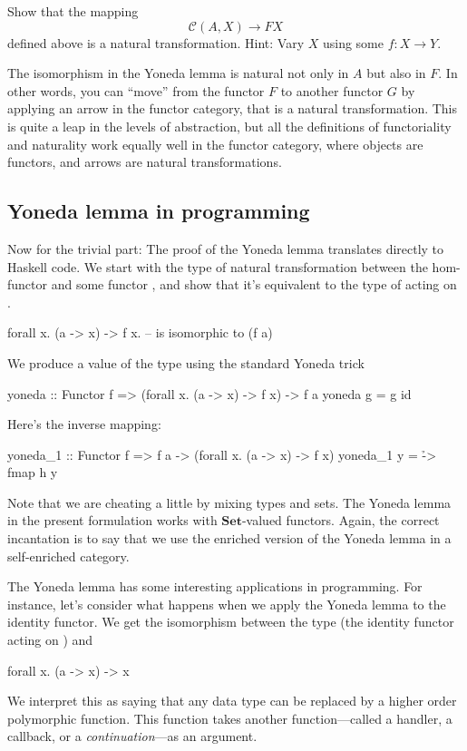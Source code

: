 \documentclass[DaoFP]{subfiles}
\begin{document}
\begin{exercise}
Show that the mapping 
\[ \mathcal{C}(A, X) \to F X\]
defined above is a natural transformation. Hint: Vary $X$ using some $f \colon X \to Y$.
\end{exercise}

The isomorphism in the Yoneda lemma is natural not only in $A$ but also in $F$. In other words, you can ``move'' from the functor $F$ to another functor $G$ by applying an arrow in the functor category, that is a natural transformation. This is quite a leap in the levels of abstraction, but all the definitions of functoriality and naturality work equally well in the functor category, where objects are functors, and arrows are natural transformations.

\subsection{Yoneda lemma in programming}

Now for the trivial part: The proof of the Yoneda lemma translates directly to Haskell code. We start with the type of natural transformation between the hom-functor  and some functor , and show that it's equivalent to the type of  acting on .
\begin{haskell}
forall x. (a -> x) -> f x.   -- is isomorphic to (f a)
\end{haskell}
We produce a value of the type  using the standard Yoneda trick
\begin{haskell}
yoneda :: Functor f => (forall x. (a -> x) -> f x) -> f a
yoneda g = g id
\end{haskell}
Here's the inverse mapping:
\begin{haskell}
yoneda_1 :: Functor f => f a -> (forall x. (a -> x) -> f x)
yoneda_1 y = \h -> fmap h y
\end{haskell}

Note that we are cheating a little by mixing types and sets. The Yoneda lemma in the present formulation works with  $\mathbf{Set}$-valued functors. Again, the correct incantation is to say that we use the enriched version of the Yoneda lemma in a self-enriched category.

The Yoneda lemma has some interesting applications in programming. For instance, let's consider what happens when we apply the Yoneda lemma to the identity functor. We get the isomorphism between the type  (the identity functor acting on ) and
\begin{haskell}
forall x. (a -> x) -> x
\end{haskell}
We interpret this as saying that any data type  can be replaced by a higher order polymorphic function. This function takes another function---called a handler, a callback, or a \emph{continuation}---as an argument. 
\end{document}
